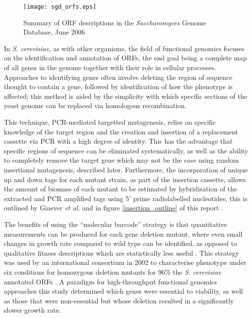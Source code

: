 \begin{figure}
\centering
\texttt{[image: sgd\_orfs.eps]}
\caption[ORF descriptions in the \emph{Saccharomyces} Genome Database]{Summary of ORF descriptions in the \emph{Saccharomyces} Genome Database, June 2006}
\label{figure:orf_totals}
\end{figure}

In \emph{S. cerevisiae}, as with other organisms, the field of functional genomics focuses on the identification and annotation of ORFs, the end goal being a complete map of all genes in the genome together with their role in cellular processes. Approaches to identifying genes often involve deleting the region of sequence thought to contain a gene, followed by identification of how the phenotype is affected; this method is aided by the simplicity with which specific sections of the yeast genome can be replaced via homologous recombination.

This technique, PCR-mediated targetted mutagenesis, relies on specific knowledge of the target region and the creation and insertion of a replacement cassette via PCR with a high degree of identity. This has the advantage that specific regions of sequence can be eliminated systematically, as well as the ability to completely remove the target gene which may not be the case using random insertional mutagenesis, described later. Furthermore, the incorporation of unique up and down tags for each mutant strain, as part of the insertion cassette, allows the amount of biomass of each mutant to be estimated by hybridisation of the extracted and PCR amplified tags using 5' prime radiolabelled nucleotides, this is outlined by Giaever \emph{et al.}\cite{Giaever1999} and in figure \vref{insertion_outline} of this report \cite{Delneri2004,Wach1996,Wach1994}.

The benefits of using the ``molecular barcode'' strategy is that quantitative measurements can be produced for each gene deletion mutant, where even small changes in growth rate compared to wild type can be identified, as opposed to qualitative fitness descriptions which are statistically less useful \cite{Oliver2002,Winzeler1999}. This strategy was used by an international consortium in 2002 to characterise phenotype under six conditions for homozygous deletion mutants for 96\% the \emph{S. cerevisiae} annotated ORFs \cite{Giaever2002}. A paradigm for high-throughput functional genomics approaches this study determined which genes were essential to viability, as well as those that were non-essential but whose deletion resulted in a significantly slower growth rate.

